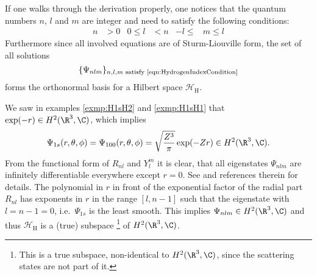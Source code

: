 If one walks through the derivation properly,
one notices that the quantum numbers $n$, $l$ and $m$ are integer and need to satisfy
the following conditions:
\begin{align}
	\label{eqn:HydrogenIndexCondition}
	n &> 0 & 0 \leq l &< n & -l \leq &m \leq l
\end{align}
Furthermore since all involved equations are of Sturm-Liouville form,
the set of all solutions
\[
	\{\Psi_{nlm} \}_{n,l,m \text{ satisfy \eqref{eqn:HydrogenIndexCondition}}}
\]
forms the orthonormal basis for a Hilbert space $\mathcal{H}_\text{H}$.

We saw in examples \vref{exmp:H1sH2} and \vref{exmp:H1sH1}
that $\exp(-r) \in H^2(\R^3, \C)$,
which implies
\begin{equation}
	\Psi_{1s}(r, \theta, \phi) = \Psi_{100}(r, \theta, \phi)
	= \sqrt{\frac{Z^3}{\pi}} \exp(-Z r) \in H^2(\R^3, \C).
	\label{eqn:FunctionGShydrogen}
\end{equation}
From the functional form of $R_{nl}$ and $Y_l^m$ it is clear,
that all eigenstates $\Psi_{nlm}$ are infinitely differentiable everywhere
except $r = 0$.
See \cite{Kato1957} and references therein for details.
The polynomial in $r$ in front of the exponential factor of the radial part $R_{nl}$
has exponents in $r$ in the range $[l, n-1]$
such that the eigenstate with $l = n-1 = 0$, i.e.~$\Psi_{1s}$ is the least smooth.
This implies $\Psi_{nlm} \in H^2(\R^3, \C)$ and thus
$\mathcal{H}_\text{H}$ is a (true) subspace
\footnote{
	This is a true subspace, \ie non-identical to $H^2(\R^3, \C)$,
	since the scattering states are not part of it.
}
of $H^2(\R^3, \C)$.
